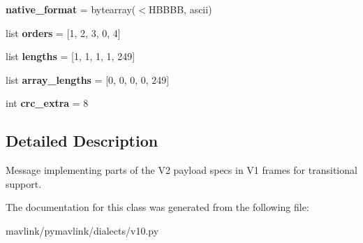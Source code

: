 \begin{DoxyCompactItemize}
\item 
\mbox{\label{classpymavlink_1_1dialects_1_1v10_1_1MAVLink__v2__extension__message_ab60e81ab9b3165ba23fb9af68284206b}} 
{\bfseries native\+\_\+format} = bytearray(\textquotesingle{}$<$H\+B\+B\+BB\textquotesingle{}, \textquotesingle{}ascii\textquotesingle{})
\item 
\mbox{\label{classpymavlink_1_1dialects_1_1v10_1_1MAVLink__v2__extension__message_a8a89a578b06352a5b916869da4f728f3}} 
list {\bfseries orders} = \mbox{[}1, 2, 3, 0, 4\mbox{]}
\item 
\mbox{\label{classpymavlink_1_1dialects_1_1v10_1_1MAVLink__v2__extension__message_aee0ad563c8bfb8f418e0f58e68b6c1c6}} 
list {\bfseries lengths} = \mbox{[}1, 1, 1, 1, 249\mbox{]}
\item 
\mbox{\label{classpymavlink_1_1dialects_1_1v10_1_1MAVLink__v2__extension__message_a3426f042f33a1a3116e891baceb7937f}} 
list {\bfseries array\+\_\+lengths} = \mbox{[}0, 0, 0, 0, 249\mbox{]}
\item 
\mbox{\label{classpymavlink_1_1dialects_1_1v10_1_1MAVLink__v2__extension__message_a8ef33220e93ae148c2c76985fe71e076}} 
int {\bfseries crc\+\_\+extra} = 8
\end{DoxyCompactItemize}


\subsection{Detailed Description}
\begin{DoxyVerb}Message implementing parts of the V2 payload specs in V1
frames for transitional support.
\end{DoxyVerb}
 

The documentation for this class was generated from the following file\+:\begin{DoxyCompactItemize}
\item 
mavlink/pymavlink/dialects/v10.\+py\end{DoxyCompactItemize}
